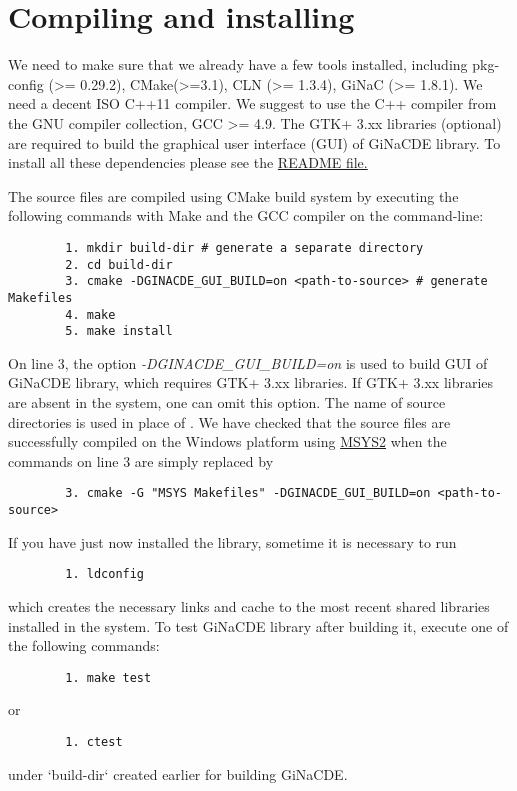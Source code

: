 \documentclass[prd,aps,floats,showkeys,nofootinbib,notitlepage]{revtex4-2}
\begin{document}
	
	\section{Compiling and installing}\label{sec:compile}
	We need to make sure that we already have a few tools installed, including pkg-config (>= 0.29.2), CMake(>=3.1), CLN (>= 1.3.4), GiNaC (>= 1.8.1). We need a decent ISO C++11 compiler. We suggest to use the C++ compiler from the GNU compiler collection, GCC >= 4.9. The GTK+ 3.xx libraries (optional) are required to build the graphical user interface (GUI) of GiNaCDE library. To install all these dependencies please see the \href{https://github.com/mithun218/GiNaCDE/tree/master#readme}{README file.} 
	
	The source files are compiled using CMake build system by executing the following commands with Make and the GCC compiler on the command-line:
	\begin{verbatim}
		1. mkdir build-dir # generate a separate directory
		2. cd build-dir
		3. cmake -DGINACDE_GUI_BUILD=on <path-to-source> # generate Makefiles
		4. make
		5. make install
	\end{verbatim}
	On line 3, the option {\em -DGINACDE\_GUI\_BUILD=on} is used to build GUI of GiNaCDE library, which requires GTK+ 3.xx libraries. If GTK+ 3.xx libraries are absent in the system, one can omit this option. The name of source directories is used in place of {\em <path-to-source>}. We have checked that the source files are successfully compiled on the Windows platform using \href{https://www.msys2.org}{MSYS2} when the commands on line 3 are simply replaced by
	\begin{verbatim}
		3. cmake -G "MSYS Makefiles" -DGINACDE_GUI_BUILD=on <path-to-source>
	\end{verbatim}
	If you have just now installed the library, sometime it is necessary to run
	\begin{verbatim}
		1. ldconfig
	\end{verbatim}
	which creates the necessary links and cache to the most recent shared libraries installed in the system.
	To test GiNaCDE library after building it, execute one of the following commands:
	\begin{verbatim}
		1. make test
	\end{verbatim}
	or
	\begin{verbatim}
		1. ctest
	\end{verbatim}
	under `build-dir` created earlier for building GiNaCDE.
	
\end{document}
